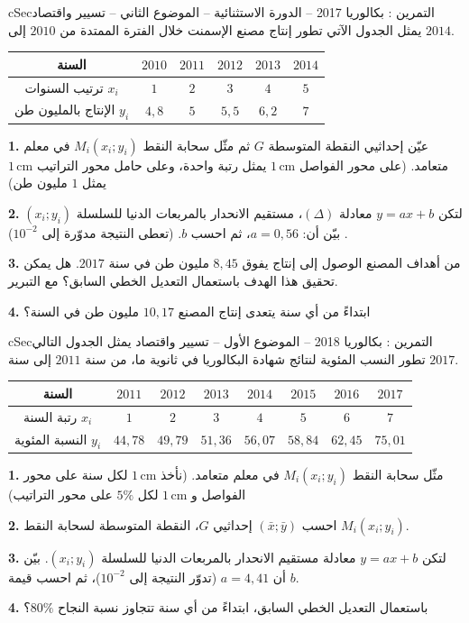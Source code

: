 \documentclass[12pt,a4paper]{article}
\newenvironment{BOX}[2]{\begin{otherlanguage}{english}\begin{arbox}{#1}{#2}}{\end{arbox}\end{otherlanguage}}
\newcounter{exo}
\newenvironment{tamrin}[1]{\stepcounter{exo}\begin{BOX}{cSec}{التمرين \theexo: #1}}{\end{BOX}}
\newcommand{\QQ}[1]{\par\smallskip\textbf{#1.} }
\begin{document}
\begin{tamrin}{بكالوريا 2017 -- الدورة الاستثنائية -- الموضوع الثاني -- تسيير واقتصاد}
يمثل الجدول الآتي تطور إنتاج مصنع الإسمنت خلال الفترة الممتدة من $2010$ إلى $2014$.
\begin{center}
\begin{tabular}{|C|c|c|c|c|c|}\hline
{} السنة & $2010$ & $2011$ & $2012$ & $2013$ & $2014$\\\hline
ترتيب السنوات $x_i$ & $1$ & $2$ & $3$ & $4$ & $5$\\\hline
الإنتاج بالمليون طن $y_i$ & $4{,}8$ & $5$ & $5{,}5$ & $6{,}2$ & $7$\\\hline
\end{tabular}
\end{center}

\QQ{1} عيّن إحداثيي النقطة المتوسطة $G$ ثم مثّل سحابة النقط $M_i(x_i;y_i)$ في معلم متعامد. (على محور الفواصل $1\,\text{cm}$ يمثل رتبة واحدة، وعلى حامل محور التراتيب $1\,\text{cm}$ يمثل $1$ مليون طن)
\QQ{2} لتكن $y=ax+b$ معادلة $(\Delta)$، مستقيم الانحدار بالمربعات الدنيا للسلسلة $(x_i;y_i)$. بيّن أن: $a=0{,}56$، ثم احسب $b$. (تعطى النتيجة مدوّرة إلى $10^{-2}$)
\QQ{3} من أهداف المصنع الوصول إلى إنتاج يفوق $8{,}45$ مليون طن في سنة $2017$. هل يمكن تحقيق هذا الهدف باستعمال التعديل الخطي السابق؟ مع التبرير.
\QQ{4} ابتداءً من أي سنة يتعدى إنتاج المصنع $10{,}17$ مليون طن في السنة؟
\end{tamrin}
\Needspace{16cm}

\begin{tamrin}{بكالوريا 2018 -- الموضوع الأول -- تسيير واقتصاد}
يمثل الجدول التالي تطور النسب المئوية لنتائج شهادة البكالوريا في ثانوية ما، من سنة $2011$ إلى سنة $2017$.
\begin{center}
\begin{tabular}{|C|c|c|c|c|c|c|c|}\hline
{} السنة & $2011$ & $2012$ & $2013$ & $2014$ & $2015$ & $2016$ & $2017$\\\hline
رتبة السنة $x_i$ & $1$ & $2$ & $3$ & $4$ & $5$ & $6$ & $7$\\\hline
النسبة المئوية $y_i$ & $44{,}78$ & $49{,}79$ & $51{,}36$ & $56{,}07$ & $58{,}84$ & $62{,}45$ & $75{,}01$\\\hline
\end{tabular}
\end{center}

\QQ{1} مثّل سحابة النقط $M_i(x_i;y_i)$ في معلم متعامد. (نأخذ $1\,\text{cm}$ لكل سنة على محور الفواصل و $1\,\text{cm}$ لكل $5\%$ على محور التراتيب)
\QQ{2} احسب $(\bar x;\bar y)$ إحداثيي $G$، النقطة المتوسطة لسحابة النقط $M_i(x_i;y_i)$.
\QQ{3} لتكن $y=ax+b$ معادلة مستقيم الانحدار بالمربعات الدنيا للسلسلة $(x_i;y_i)$. بيّن أن $a=4{,}41$ (تدوّر النتيجة إلى $10^{-2}$)، ثم احسب قيمة $b$.
\QQ{4} باستعمال التعديل الخطي السابق، ابتداءً من أي سنة تتجاوز نسبة النجاح $80\%$؟
\end{tamrin}
\Needspace{14cm}
\end{document}
